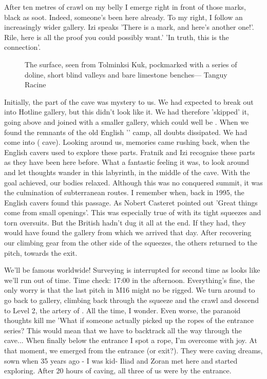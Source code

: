 After ten metres of crawl on my belly I emerge right in front of those marks, black as soot. Indeed, someone's been here already. To my right, I follow an increasingly wider gallery. Izi speaks 'There is a mark, and here's another one!'. Rile, here is all the proof you could possibly want.' 'In truth, this is the connection'.


 \begin{figure}[t!]
\checkoddpage \ifoddpage \forcerectofloat \else \forceversofloat \fi
\centering
{}
\caption{The \protect{} surface, seen from Tolminksi Kuk, pockmarked with a series of doline, short blind valleys and bare limestone benches--- Tanguy Racine }
\label{mig seen from kuk}
\end{figure}


 Initially, the part of the cave was mystery to us. We had expected to break out into Hotline gallery, but this didn't look like it. We had therefore 'skipped' it, going above and joined with a smaller gallery, which could well be . When we found the remnants of the old English '' camp, all doubts dissipated. We had come into  ( cave). Looking around us, memories came rushing back, when the English cavers used to explore these parts. Fratnik and Izi recognise these parts as they have been here before. What a fantastic feeling it was, to look around and let thoughts wander in this labyrinth, in the middle of the cave. With the goal achieved, our bodies relaxed. Although this was no conquered summit, it was the culmination of subterranean routes. I remember when, back in 1995, the English cavers found this passage. As Nobert Casteret pointed out 'Great things come from small openings'. This was especially true of with its tight squeezes and torn oversuits. But the British hadn't dug it all at the end. If they had, they would have found the gallery from which we arrived that day. After recovering our climbing gear from the other side of the squeezes, the others returned to the pitch, towards the exit.

 We'll be famous worldwide! Surveying is interrupted for second time as looks like we'll run out of time. Time check: 17:00 in the afternoon. Everything's fine, the only worry is that the last pitch in M16 might no be rigged. We turn around to go back to  gallery, climbing back through the squeeze and the crawl and descend to Level 2, the artery of .  All the time, I wonder. Even worse, the paranoid thoughts kill me 'What if someone actually picked up the ropes of the entrance series? This would mean that we have to backtrack all the way through the cave... When finally below the entrance I spot a rope, I'm overcome with joy. At that moment, we emerged from the entrance (or exit?). They were caving dreams, sown when 35 years ago - I was kid- Iliad and Zoran met here and started exploring. After 20 hours of caving, all three of us were by the entrance.
 
